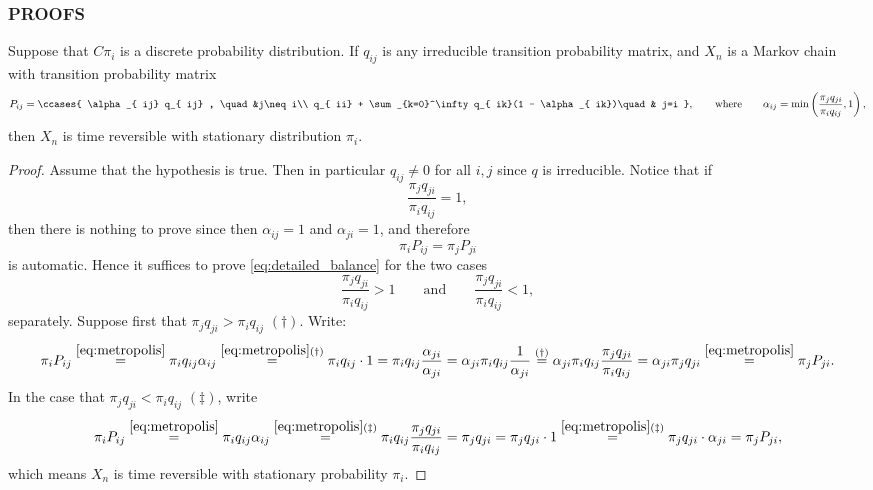\documentclass[11pt,english,a4paper]{article}
\begin{document}
\subsubsection*{\uppercase{Proofs}}

\begin{theorem}
Suppose that $C\pi_i$ is a discrete probability distribution. If $q_{ij}$ is any irreducible transition probability matrix, and $X_n$ is a Markov chain with transition probability matrix 
\begin{equation}
P_{ij} = \ccases {
\alpha_{  ij} q_{  ij} , \quad &j\neq i\\
q_{  ii} + \sum_{k=0}^\infty q_{  ik}(1 - \alpha_{  ik})\quad & j=i
},\qquad \text{where} \qquad \alpha_{  ij} = \min \left( \frac{\pi_j q_{  ji}}{\pi_i q_{  ij}} , 1\right), \label{eq:metropolis}
\end{equation}
then $X_n$ is time reversible with stationary distribution $\pi_i$. \label{thm:metropolis}
\end{theorem}
\begin{proof}
Assume that the hypothesis is true. Then in particular $q_{  ij} \neq 0$ for all $i,j$ since $q$ is irreducible. Notice that if 
\[
\frac{\pi_j q_{  ji}}{\pi_i q_{  ij}} = 1,
\]
then there is nothing to prove since then $\alpha_{ij} = 1$ and $\alpha_{ji} = 1$, and therefore
\begin{equation}
\pi_iP_{  ij} = \pi_jP_{  ji} \label{eq:detailed_balance}
\end{equation} 
is automatic. Hence it suffices to prove \eqref{eq:detailed_balance} for the two cases
\[
\frac{\pi_j q_{  ji}}{\pi_i q_{  ij}} > 1 \qquad \text{and} \qquad \frac{\pi_j q_{  ji}}{\pi_i q_{  ij}} < 1,
\]
separately. Suppose first that $\pi_j q_{  ji} > \pi_i q_{  ij}$ $(\dagger)$. Write:
\[
\pi_iP_{  ij} \stackrel{\eqref{eq:metropolis}}{=} \pi_i  q_{  ij} \alpha_{  ij} \stackrel{\eqref{eq:metropolis}(\dagger)}{=} \pi_i q_{  ij} \cdot 1 =
\pi_i q_{  ij}  \frac{\alpha_{  ji}}{\alpha_{  ji}} = \alpha_{  ji}\pi_i q_{  ij}  \frac{1}{\alpha_{  ji}} \stackrel{(\dagger)}{=} \alpha_{  ji}\pi_i q_{  ij}  \frac{\pi_j q_{  ji}}{\pi_i q_{  ij}} = \alpha_{  ji}  \pi_j q_{  ji} \stackrel{\eqref{eq:metropolis}}{=} \pi_jP_{  ji}. 
\]
In the case that $\pi_j q_{  ji} < \pi_i q_{  ij}$ $(\ddagger)$, write
\[
\pi_iP_{  ij} \stackrel{\eqref{eq:metropolis}}{=} \pi_i  q_{  ij} \alpha_{  ij} \stackrel{\eqref{eq:metropolis}(\ddagger)}{=} \pi_i q_{  ij} \frac{\pi_j q_{  ji}}{\pi_i q_{  ij}} = \pi_j q_{  ji} = \pi_j q_{  ji} \cdot 1 \stackrel{\eqref{eq:metropolis}(\ddagger)}{=} \pi_j q_{  ji} \cdot \alpha_{  ji} = \pi_jP_{  ji},
\]
which means $X_n$ is time reversible with stationary probability $\pi_i$.
\end{proof}
\end{document}
